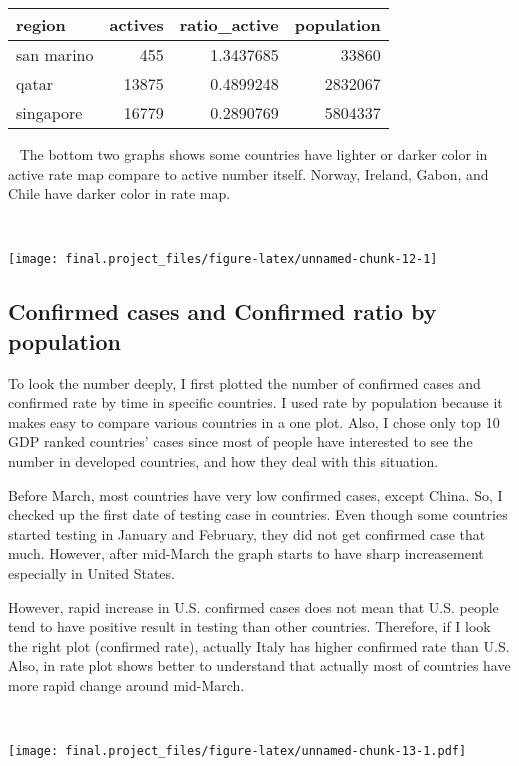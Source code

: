 \documentclass[
  11pt,
]{article}
\begin{document}
\begin{longtable}[]{@{}lrrr@{}}
\toprule
region & actives & ratio\_active & population\tabularnewline
\midrule
\endhead
san marino & 455 & 1.3437685 & 33860\tabularnewline
qatar & 13875 & 0.4899248 & 2832067\tabularnewline
singapore & 16779 & 0.2890769 & 5804337\tabularnewline
\bottomrule
\end{longtable}

~ The bottom two graphs shows some countries have lighter or darker
color in active rate map compare to active number itself. Norway,
Ireland, Gabon, and Chile have darker color in rate map.

~

\begin{center}\texttt{[image: final.project\_files/figure-latex/unnamed-chunk-12-1]} \end{center}

\hypertarget{confirmed-cases-and-confirmed-ratio-by-population}{%
\subsection{Confirmed cases and Confirmed ratio by
population}\label{confirmed-cases-and-confirmed-ratio-by-population}}

To look the number deeply, I first plotted the number of confirmed cases
and confirmed rate by time in specific countries. I used rate by
population because it makes easy to compare various countries in a one
plot. Also, I chose only top 10 GDP ranked countries' cases since most
of people have interested to see the number in developed countries, and
how they deal with this situation.

Before March, most countries have very low confirmed cases, except
China. So, I checked up the first date of testing case in countries.
Even though some countries started testing in January and February, they
did not get confirmed case that much. However, after mid-March the graph
starts to have sharp increasement especially in United States.

However, rapid increase in U.S. confirmed cases does not mean that U.S.
people tend to have positive result in testing than other countries.
Therefore, if I look the right plot (confirmed rate), actually Italy has
higher confirmed rate than U.S. Also, in rate plot shows better to
understand that actually most of countries have more rapid change around
mid-March.

~

\texttt{[image: final.project\_files/figure-latex/unnamed-chunk-13-1.pdf]}
\end{document}
